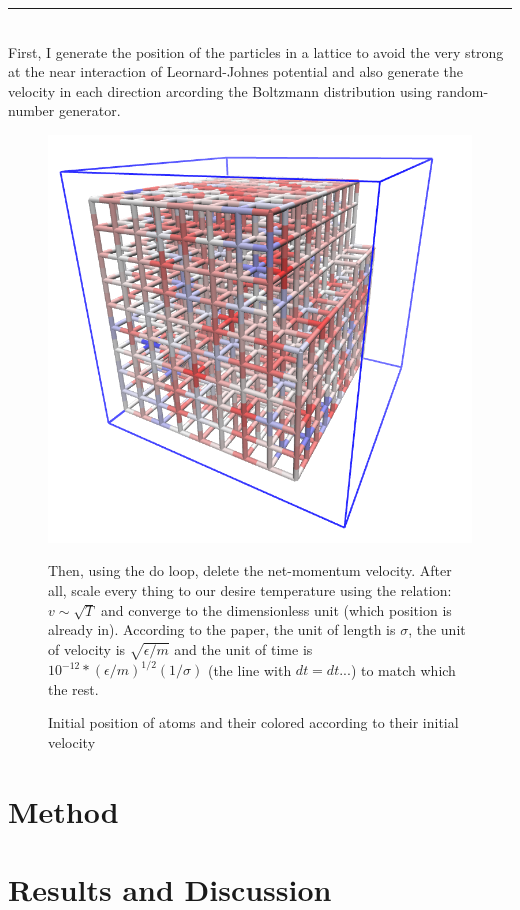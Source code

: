 \documentclass[a4paper]{article}
\begin{document}
\rule{\textwidth}{1pt}\\\null
\quad First, I generate the position of the particles in a lattice to avoid the very strong at the near interaction of Leornard-Johnes potential and also generate the velocity in each direction arcording the Boltzmann distribution using random-number generator.
\begin{figure}[h]
\begin{center}
	\includegraphics[width = 0.5\linewidth]{Images/Lattice.png}
\caption{Initial position of atoms and their colored according to their initial velocity}
\end{center}
Then, using the do loop, delete the net-momentum velocity. After all, scale every thing to our desire temperature using the relation: \(v \sim \sqrt{T}\) and converge to the dimensionless unit (which position is already in). According to the paper, the unit of length is \(\sigma\), the unit of velocity is \(\sqrt{\epsilon/m}\) and the unit of time is \(10^{-12}*(\epsilon/m)^{1/2}(1/\sigma)\) (the line with \(dt = dt...\)) to match which the rest.
\end{figure}
\section{Method}
\section{Results and Discussion}
\end{document}

